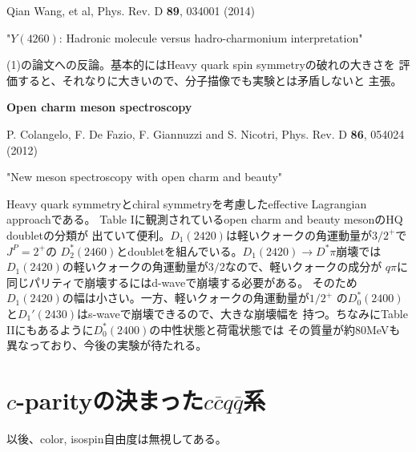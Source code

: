 \documentclass[a4j]{jarticle}
\def\Jpsi{{J\!/\!\psi}{}}
\def\cbar{\overline{{c}}}
\def\qbar{\overline{{q}}}
\begin{document}
\vspace{5mm}

Qian Wang, et al, Phys. Rev. D {\bf 89}, 034001 (2014)

"$Y(4260)$: Hadronic molecule versus hadro-charmonium interpretation"

\vspace{5mm}

(1)の論文への反論。基本的にはHeavy quark spin symmetryの破れの大きさを
評価すると、それなりに大きいので、分子描像でも実験とは矛盾しないと
主張。

\vspace{10mm}
{\bf \large Open charm meson spectroscopy}

P. Colangelo, F. De Fazio, F. Giannuzzi and S. Nicotri, Phys. Rev. D {\bf 86}, 054024 (2012)

"New meson spectroscopy with open charm and beauty"

\vspace{5mm}

Heavy quark symmetryとchiral symmetryを考慮したeffective Lagrangian approachである。
Table Iに観測されているopen charm and beauty mesonのHQ doubletの分類が
出ていて便利。$D_1(2420)$は軽いクォークの角運動量が$3/2^+$で$J^P = 2^+$の
$D_2^\ast(2460)$とdoubletを組んでいる。$D_1(2420) \to D^\ast \pi$崩壊では
$D_1(2420)$の軽いクォークの角運動量が$3/2$なので、軽いクォークの成分が
$q \pi$に同じパリティで崩壊するにはd-waveで崩壊する必要がある。
そのため$D_1(2420)$の幅は小さい。一方、軽いクォークの角運動量が$1/2^+$
の$D_0^\ast(2400)$と$D_1'(2430)$はs-waveで崩壊できるので、大きな崩壊幅を
持つ。ちなみにTable IIにもあるように$D_0^\ast(2400)$の中性状態と荷電状態では
その質量が約80MeVも異なっており、今後の実験が待たれる。

\newpage
\section{$c$-parityの決まった$c\cbar q\qbar$系}
以後、color, isospin自由度は無視してある。
\end{document}
